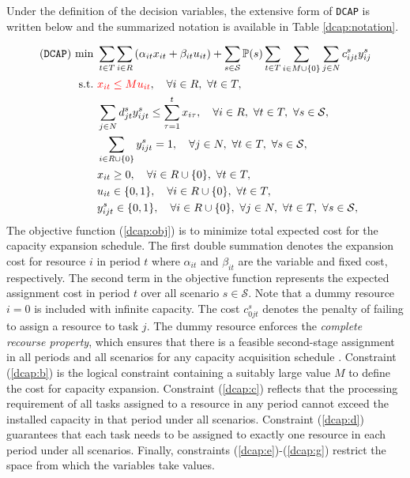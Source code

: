 Under the definition of the decision variables, the extensive form of \texttt{DCAP} is written below and the summarized notation is available in Table \ref{dcap:notation}.

\begin{subequations}
	\begin{align}
	(\texttt{DCAP})\ \textrm{min}\ &\sum_{t\in T}\sum_{i\in R}\left(\alpha_{it}x_{it}+\beta_{it}u_{it}\right)+\sum_{s\in\mathcal{S}}\PP(s)\sum_{t\in T}\sum_{i\in M\cup\{0\}}\sum_{j\in N}c_{ijt}^{s}y_{ij}^s	\label{dcap:obj} \\
	\textrm{s.t.}\ & \textcolor{red}{x_{it}\le Mu_{it}},\quad\forall i\in R,\ \forall t\in T,	\label{dcap:b}\\
	&\sum_{j\in N}d_{jt}^s y_{ijt}^s\le\sum_{\tau=1}^{t}x_{i\tau},\quad\forall i\in R,\ \forall t\in T,\ \forall s\in\mathcal{S},\label{dcap:c}\\
	&\sum_{i\in R\cup \{0\}}y_{ijt}^s=1,\quad\forall j\in N,\ \forall t\in T,\ \forall s\in\mathcal{S}, \label{dcap:d} \\
	&x_{it}\ge 0,\quad\forall i\in R\cup\{0\},\ \forall t\in T,\label{dcap:e} \\
	&u_{it}\in\{0,1\}, \quad\forall i\in R\cup\{0\},\ \forall t\in T,\label{dcap:f}\\
	&y_{ijt}^s\in\{0,1\},\quad\forall i\in R\cup\{0\},\ \forall j\in N,\ \forall t\in T,\ \forall s\in\mathcal{S},\label{dcap:g}
	\end{align}
\end{subequations}
The objective function (\ref{dcap:obj}) is to minimize total expected cost for the capacity expansion schedule. The first double summation denotes the expansion cost for resource $i$ in period $t$ where $\alpha_{it}$ and $\beta_{it}$ are the variable and fixed cost, respectively. The second term in the objective function represents the expected assignment cost in period $t$ over all scenario $s\in\mathcal{S}$. Note that a dummy resource $i=0$ is included with infinite capacity. The cost $c_{0jt}^s$ denotes the penalty of failing to assign a resource to task $j$. The dummy resource enforces the \textit{complete recourse property}, which ensures that there is a feasible second-stage assignment in all periods and all scenarios for any capacity acquisition schedule \cite{journal:AG2004}. Constraint (\ref{dcap:b}) is the logical constraint containing a suitably large value $M$ to define the cost for capacity expansion. Constraint (\ref{dcap:c}) reflects that the processing requirement of all tasks assigned to a resource in any period cannot exceed the installed capacity in that period under all scenarios. Constraint (\ref{dcap:d}) guarantees that each task needs to be assigned to exactly one resource in each period under all scenarios. Finally, constraints (\ref{dcap:e})-(\ref{dcap:g}) restrict the space from which the variables take values.


